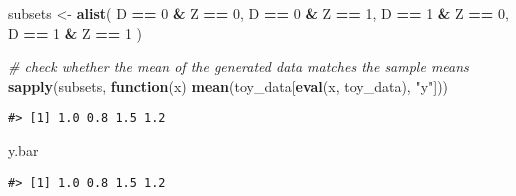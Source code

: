 \documentclass[
]{article}
\newenvironment{Shaded}{\begin{snugshade}}{\end{snugshade}}
\newcommand{\CommentTok}[1]{\textcolor[rgb]{0.56,0.35,0.01}{\textit{#1}}}
\newcommand{\ControlFlowTok}[1]{\textcolor[rgb]{0.13,0.29,0.53}{\textbf{#1}}}
\newcommand{\DecValTok}[1]{\textcolor[rgb]{0.00,0.00,0.81}{#1}}
\newcommand{\KeywordTok}[1]{\textcolor[rgb]{0.13,0.29,0.53}{\textbf{#1}}}
\newcommand{\NormalTok}[1]{#1}
\newcommand{\OperatorTok}[1]{\textcolor[rgb]{0.81,0.36,0.00}{\textbf{#1}}}
\newcommand{\StringTok}[1]{\textcolor[rgb]{0.31,0.60,0.02}{#1}}
\begin{document}
\begin{Shaded}
\begin{Highlighting}[]
\NormalTok{subsets \textless{}{-}}\StringTok{ }\KeywordTok{alist}\NormalTok{(}
\NormalTok{  D }\OperatorTok{==}\StringTok{ }\DecValTok{0} \OperatorTok{\&}\StringTok{ }\NormalTok{Z }\OperatorTok{==}\StringTok{ }\DecValTok{0}\NormalTok{,}
\NormalTok{  D }\OperatorTok{==}\StringTok{ }\DecValTok{0} \OperatorTok{\&}\StringTok{ }\NormalTok{Z }\OperatorTok{==}\StringTok{ }\DecValTok{1}\NormalTok{,}
\NormalTok{  D }\OperatorTok{==}\StringTok{ }\DecValTok{1} \OperatorTok{\&}\StringTok{ }\NormalTok{Z }\OperatorTok{==}\StringTok{ }\DecValTok{0}\NormalTok{,}
\NormalTok{  D }\OperatorTok{==}\StringTok{ }\DecValTok{1} \OperatorTok{\&}\StringTok{ }\NormalTok{Z }\OperatorTok{==}\StringTok{ }\DecValTok{1}
\NormalTok{)}

\CommentTok{\# check whether the mean of the generated data matches the sample means}
\KeywordTok{sapply}\NormalTok{(subsets, }\ControlFlowTok{function}\NormalTok{(x) }\KeywordTok{mean}\NormalTok{(toy\_data[}\KeywordTok{eval}\NormalTok{(x, toy\_data), }\StringTok{"y"}\NormalTok{]))}
\end{Highlighting}
\end{Shaded}

\begin{verbatim}
#> [1] 1.0 0.8 1.5 1.2
\end{verbatim}

\begin{Shaded}
\begin{Highlighting}[]
\NormalTok{y.bar}
\end{Highlighting}
\end{Shaded}

\begin{verbatim}
#> [1] 1.0 0.8 1.5 1.2
\end{verbatim}
\end{document}
